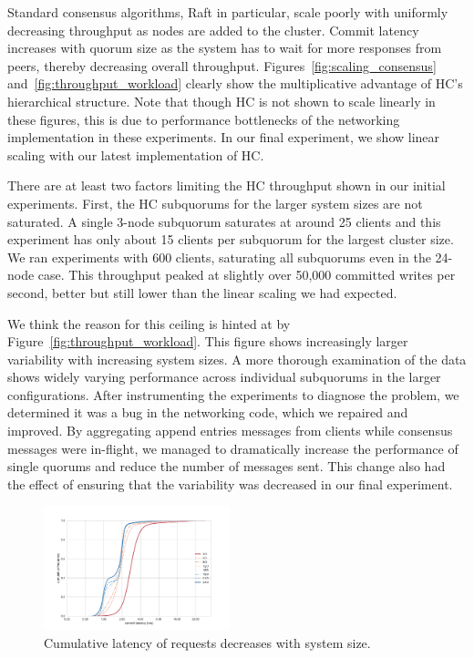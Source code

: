 \documentclass[10pt,conference]{IEEEtran}
\begin{document}
Standard consensus algorithms, Raft in particular, scale poorly with uniformly
decreasing throughput as nodes are added to the cluster.
Commit latency increases with quorum size as the system has to wait for more responses
from peers, thereby decreasing overall throughput.
Figures~\ref{fig:scaling_consensus} and~\ref{fig:throughput_workload}
clearly show the multiplicative advantage of HC's hierarchical structure.
Note that though HC is not shown to scale linearly in these figures, this is due to
performance bottlenecks of the networking implementation in these experiments.
In our final experiment, we show linear scaling with our latest implementation of HC.

There are at least two factors limiting the HC throughput shown in our initial experiments.
First, the HC subquorums for the larger system sizes are not saturated.
A single 3-node subquorum saturates at around 25 clients and this experiment has only
about 15 clients per subquorum for the largest cluster size.
We ran experiments with 600 clients, saturating all subquorums even in the 24-node case.
This throughput peaked at slightly over 50,000 committed writes per second, better but
still lower than the linear scaling we had expected.

We think the reason for this ceiling is hinted at by Figure~\ref{fig:throughput_workload}.
This figure shows increasingly larger variability with increasing system sizes.
A more thorough examination of the data shows widely varying performance across
individual subquorums in the larger configurations.
After instrumenting the experiments to diagnose the problem, we determined it was a bug
in the networking code, which we repaired and improved.
By aggregating append entries messages from clients while consensus messages were
in-flight, we managed to dramatically increase the performance of single quorums and
reduce the number of messages sent.
This change also had the effect of ensuring that the variability was decreased in our
final experiment.

\begin{figure}
    \centering
    \includegraphics[width=0.48\textwidth]{figures/ec2_latency_cumfreq.pdf}
    \caption{Cumulative latency of requests decreases with system size.}
    \label{fig:latency}
\end{figure}
\end{document}

